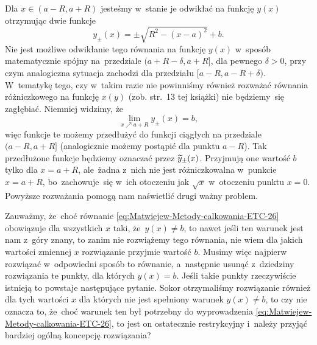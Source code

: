 \documentclass[a4paper,11pt]{article}
\numberwithin{equation}{section}
\begin{document}
Dla $x \in ( a - R, a + R )$ jesteśmy w~stanie je odwikłać na funkcję
$y( x )$ otrzymując dwie funkcje
\begin{equation}
  \label{eq:Uwagi-do-konkrentych-stron-07}
  y_{ \pm }( x ) = \pm\sqrt{ R^{ 2 } - ( x - a )^{ 2 } } + b.
\end{equation}
Nie jest możliwe odwikłanie tego równania na funkcję $y( x )$ w~sposób
matematycznie spójny na~przedziale $( a + R - \delta, a + R ]$, dla pewnego
$\delta > 0$, przy czym analogiczna sytuacja zachodzi dla przedziału
$[ a - R, a - R + \delta )$. W~tematykę tego, czy w~takim razie nie powinniśmy
również rozważać równania różniczkowego na funkcję $x( y )$ (zob. str.~13
tej książki) nie będziemy~się zagłębiać. Niemniej widzimy, że
\begin{equation}
  \label{eq:Uwagi-do-konkrentych-stron-08}
  \lim_{ x \nearrow a + R } y_{ \pm }( x ) = b,
\end{equation}
więc funkcje te możemy przedłużyć do funkcji ciągłych na przedziale
$( a - R, a + R ]$ (analogicznie możemy postąpić dla punktu $a - R$).
Tak przedłużone funkcje będziemy oznaczać przez $\widetilde{y}_{ \pm }( x )$.
Przyjmują one wartość $b$ tylko dla $x = a + R$, ale~żadna z~nich nie jest
różniczkowalna w~punkcie $x = a + R$, bo~zachowuje~się w~ich otoczeniu jak
$\sqrt{ x }$ w~otoczeniu punktu $x = 0$. Powyższe rozważania pomogą nam
naświetlić drugi ważny problem.

Zauważmy, że~choć równanie \eqref{eq:Matwiejew-Metody-calkowania-ETC-26}
obowiązuje dla wszystkich $x$ taki, że~$y( x ) \neq b$, to nawet jeśli ten
warunek jest nam z~góry znany, to zanim nie rozwiążemy tego równania, nie
wiem dla jakich wartości zmiennej $x$ rozwiązanie przyjmie wartość $b$.
Musimy więc najpierw rozwiązać w~odpowiedni sposób to równanie, a~następnie
usunąć z~dziedziny rozwiązania te punkty, dla których $y( x ) = b$. Jeśli
takie punkty rzeczywiście istnieją to powstaje następujące pytanie. Sokor
otrzymaliśmy rozwiązanie również dla tych wartości $x$ dla
których nie jest spełniony warunek $y( x ) \neq b$, to czy nie oznacza to,
że~choć warunek ten był potrzebny do wyprowadzenia
\eqref{eq:Matwiejew-Metody-calkowania-ETC-26}, to jest on ostatecznie
restrykcyjny i~należy przyjąć bardziej ogólną koncepcję rozwiązania?
\end{document}
